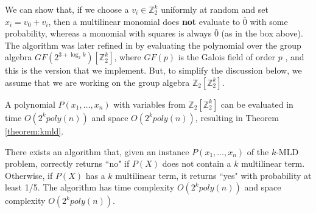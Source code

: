 
We can show that, if we choose a $v_i \in \mathbb{Z}_2^k$ uniformly at random and set $x_i = v_0 + v_i$, then a multilinear monomial does \textbf{not} evaluate to $\bar 0$ with some probability, whereas a monomial with squares is always $\bar 0$ (as in the box above).
The algorithm was later refined in \cite{williams2009finding} by evaluating the polynomial over the group algebra $GF(2^{3 + \log_2k})[\mathbb{Z}_2^k]$, where $GF(p)$ is the Galois field of order $p$ \cite{mullen2007finite}, and this is the version that we implement. But, to simplify the discussion below, we assume that we are working on the group algebra $\mathbb{Z}_2[\mathbb{Z}_2^k]$. 

A polynomial $P(x_1,\ldots,x_n)$ with variables from $\mathbb{Z}_2[\mathbb{Z}_2^k]$ can be evaluated in time $O(2^k poly(n))$ and space $O(2^kpoly(n))$, resulting in Theorem \ref{theorem:kmld}.

\begin{theorem}
\label{theorem:kmld}
There exists an algorithm that, given an instance $P(x_1,\ldots,x_n)$ of the \textsc{$k$-MLD} problem, correctly returns ``no" if $P(X)$ does not contain a $k$ multilinear term. Otherwise, if $P(X)$ has a $k$ multilinear term, it returns ``yes" with probability at least 1/5. 
The algorithm has time complexity $O(2^k poly(n))$ and space complexity $O(2^k poly(n))$.
\end{theorem}


